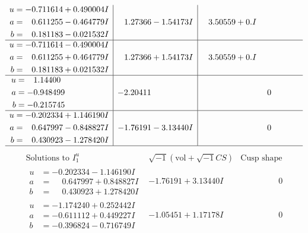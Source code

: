 \documentclass[1p]{elsarticle_modified}
\theoremstyle{definition}
\newcommand{\I}{\sqrt{-1}}
\begin{document}
$$\begin{array}{c|c|c}
\begin{aligned}
u &= -0.711614 + 0.490004 I \\
a &= \phantom{-}0.611255 - 0.464779 I \\
b &= \phantom{-}0.181183 - 0.021532 I\end{aligned}
 & \phantom{-}1.27366 - 1.54173 I & \phantom{-}3.50559 + 0. I\phantom{ +0.000000I} \\ \hline\begin{aligned}
u &= -0.711614 - 0.490004 I \\
a &= \phantom{-}0.611255 + 0.464779 I \\
b &= \phantom{-}0.181183 + 0.021532 I\end{aligned}
 & \phantom{-}1.27366 + 1.54173 I & \phantom{-}3.50559 + 0. I\phantom{ +0.000000I} \\ \hline\begin{aligned}
u &= \phantom{-}1.14400\phantom{ +0.000000I} \\
a &= -0.948499\phantom{ +0.000000I} \\
b &= -0.215745\phantom{ +0.000000I}\end{aligned}
 & -2.20411\phantom{ +0.000000I} & \phantom{-0.000000 } 0 \\ \hline\begin{aligned}
u &= -0.202334 + 1.146190 I \\
a &= \phantom{-}0.647997 - 0.848827 I \\
b &= \phantom{-}0.430923 - 1.278420 I\end{aligned}
 & -1.76191 - 3.13440 I & \phantom{-0.000000 } 0\\
 \hline 
 \end{array}$$\newpage$$\begin{array}{c|c|c}  
\text{Solutions to }I^u_{1}& \I (\text{vol} + \sqrt{-1}CS) & \text{Cusp shape}\\
 \hline 
\begin{aligned}
u &= -0.202334 - 1.146190 I \\
a &= \phantom{-}0.647997 + 0.848827 I \\
b &= \phantom{-}0.430923 + 1.278420 I\end{aligned}
 & -1.76191 + 3.13440 I & \phantom{-0.000000 } 0 \\ \hline\begin{aligned}
u &= -1.174240 + 0.252442 I \\
a &= -0.611112 + 0.449227 I \\
b &= -0.396824 - 0.716749 I\end{aligned}
 & -1.05451 + 1.17178 I & \phantom{-0.000000 } 0 \\ \hline\begin{aligned}

\end{aligned}
\end{array}$$
\end{document}
